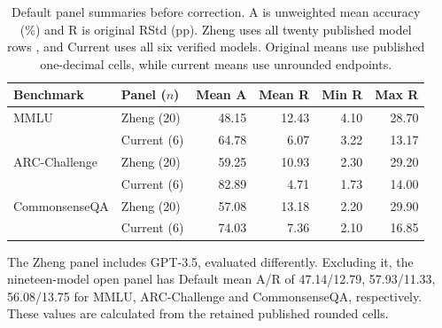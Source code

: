 \begin{table}[htbp]
\centering\small\setlength{\tabcolsep}{4pt}
\caption{Default panel summaries before correction. A is unweighted mean accuracy (\%) and R is original RStd (pp). Zheng uses all twenty published model rows \citep[Table~3, p.~22]{zheng2024robust}, and Current uses all six verified models. Original means use published one-decimal cells, while current means use unrounded endpoints.}
\label{tab:rq1-default-panels}
\begin{tabular}{llrrrr}
\toprule
Benchmark & Panel ($n$) & Mean A & Mean R & Min R & Max R\\
\midrule
MMLU & Zheng (20) & 48.15 & 12.43 & 4.10 & 28.70\\
 & Current (6) & 64.78 & 6.07 & 3.22 & 13.17\\
\addlinespace[3pt]
ARC-Challenge & Zheng (20) & 59.25 & 10.93 & 2.30 & 29.20\\
 & Current (6) & 82.89 & 4.71 & 1.73 & 14.00\\
\addlinespace[3pt]
CommonsenseQA & Zheng (20) & 57.08 & 13.18 & 2.20 & 29.90\\
 & Current (6) & 74.03 & 7.36 & 2.10 & 16.85\\
\bottomrule
\end{tabular}
\par\vspace{3pt}\begin{minipage}{.98\linewidth}\footnotesize
The Zheng panel includes GPT-3.5, evaluated differently. Excluding it, the nineteen-model open panel has Default mean A/R of 47.14/12.79, 57.93/11.33, 56.08/13.75 for MMLU, ARC-Challenge and CommonsenseQA, respectively. These values are calculated from the retained published rounded cells.
\end{minipage}
\end{table}
